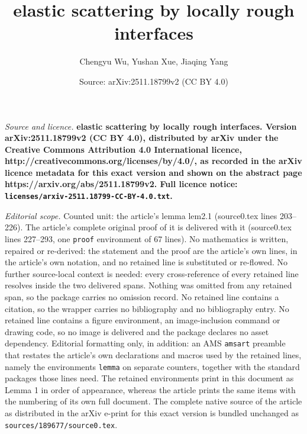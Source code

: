 \documentclass[10pt,a4paper]{amsart}
\title{\bf elastic scattering by locally rough interfaces}
\author{Chengyu Wu, Yushan Xue, Jiaqing Yang}
\date{Source: arXiv:2511.18799v2 (CC BY 4.0)}
\begin{document}
\maketitle

\noindent\emph{Source and licence.} \bf elastic scattering by locally rough interfaces. Version arXiv:2511.18799v2 (CC BY 4.0), distributed by arXiv under the Creative Commons Attribution 4.0 International licence, http://creativecommons.org/licenses/by/4.0/, as recorded in the arXiv licence metadata for this exact version and shown on the abstract page https://arxiv.org/abs/2511.18799v2. Full licence notice: \texttt{licenses/arxiv-2511.18799-CC-BY-4.0.txt}.\par\smallskip

\noindent\textit{Editorial scope.} Counted unit: the article's lemma lem2.1 (source0.tex lines 203--226). The article's complete original proof of it is delivered with it (source0.tex lines 227--293, one \texttt{proof} environment of 67 lines). No mathematics is written, repaired or re-derived: the statement and the proof are the article's own lines, in the article's own notation, and no retained line is substituted or re-flowed.  No further source-local context is needed: every cross-reference of every retained line resolves inside the two delivered spans.  Nothing was omitted from any retained span, so the package carries no omission record.  No retained line contains a citation, so the wrapper carries no bibliography and no bibliography entry.  No retained line contains a figure environment, an image-inclusion command or drawing code, so no image is delivered and the package declares no asset dependency.  Editorial formatting only, in addition: an AMS \texttt{amsart} preamble that restates the article's own declarations and macros used by the retained lines, namely the environments \texttt{lemma} on separate counters, together with the standard packages those lines need.  The retained environments print in this document as Lemma 1 in order of appearance, whereas the article prints the same items with the numbering of its own full document.  The complete native source of the article as distributed in the arXiv e-print for this exact version is bundled unchanged as \texttt{sources/189677/source0.tex}.
\end{document}
